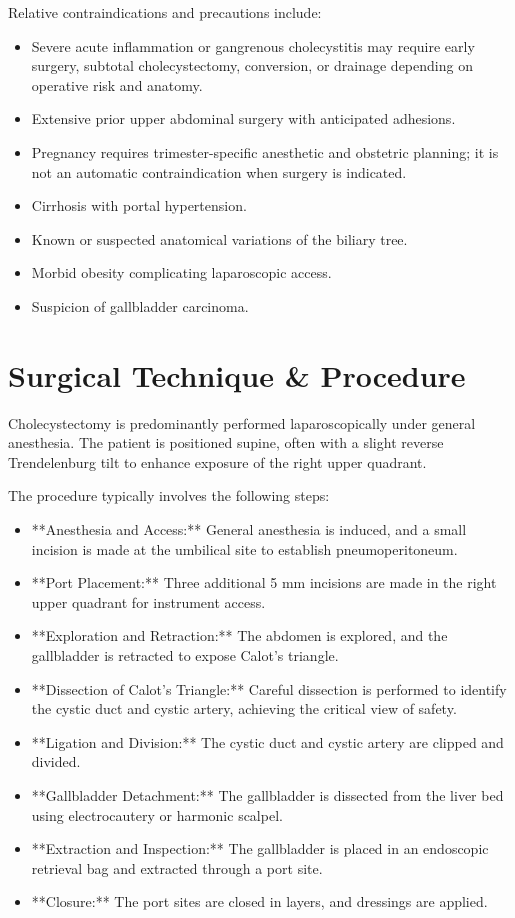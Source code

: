 Relative contraindications and precautions include:

\begin{itemize}
  \item Severe acute inflammation or gangrenous cholecystitis may require early surgery, subtotal cholecystectomy, conversion, or drainage depending on operative risk and anatomy.
  \item Extensive prior upper abdominal surgery with anticipated adhesions.
  \item Pregnancy requires trimester-specific anesthetic and obstetric planning; it is not an automatic contraindication when surgery is indicated.
  \item Cirrhosis with portal hypertension.
  \item Known or suspected anatomical variations of the biliary tree.
  \item Morbid obesity complicating laparoscopic access.
  \item Suspicion of gallbladder carcinoma.
\end{itemize}

\section*{Surgical Technique \& Procedure}
Cholecystectomy is predominantly performed laparoscopically under general anesthesia. The patient is positioned supine, often with a slight reverse Trendelenburg tilt to enhance exposure of the right upper quadrant.

The procedure typically involves the following steps:

\begin{itemize}
  \item **Anesthesia and Access:** General anesthesia is induced, and a small incision is made at the umbilical site to establish pneumoperitoneum.
  \item **Port Placement:** Three additional 5 mm incisions are made in the right upper quadrant for instrument access.
  \item **Exploration and Retraction:** The abdomen is explored, and the gallbladder is retracted to expose Calot's triangle.
  \item **Dissection of Calot's Triangle:** Careful dissection is performed to identify the cystic duct and cystic artery, achieving the critical view of safety.
  \item **Ligation and Division:** The cystic duct and cystic artery are clipped and divided.
  \item **Gallbladder Detachment:** The gallbladder is dissected from the liver bed using electrocautery or harmonic scalpel.
  \item **Extraction and Inspection:** The gallbladder is placed in an endoscopic retrieval bag and extracted through a port site.
  \item **Closure:** The port sites are closed in layers, and dressings are applied.
\end{itemize}

